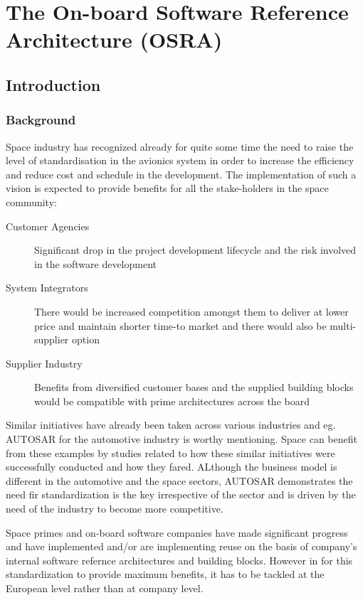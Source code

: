 
\chapter{The On-board Software Reference Architecture (OSRA)}
\label{chap:OSRA}
\section*{Introduction}
\subsection*{Background}
Space industry has recognized already for quite some time the need to raise the level of standardisation in the avionics system in order to increase the efficiency and reduce cost and schedule in the development.
The implementation of such a vision is expected to provide benefits for all the stake-holders in the space community:
\begin{description}
\item  [Customer Agencies] Significant drop in the project development lifecycle and the risk involved in the software development
\item [System Integrators] There would be increased competition amongst them to deliver at lower price and maintain shorter time-to market and there would also be multi-supplier option
\item [Supplier Industry] Benefits from diversified customer bases and the supplied building blocks would be compatible with prime architectures across the board
\end{description}

Similar initiatives have already been taken across various industries and eg. AUTOSAR for the automotive industry is worthy mentioning. Space can benefit from these examples by studies related to how these similar initiatives were successfully conducted and how they fared. ALthough the business model is different in the automotive and the space sectors, AUTOSAR demonstrates the need fir standardization is the key irrespective of the sector and is driven by the need of the industry to become more competitive.

Space primes and on-board software companies have made significant progress and have implemented and/or are implementing reuse on the basis of company's internal software refernce architectures and building blocks. However in for this standardization to provide maximum benefits, it has to be tackled at the European level rather than at company level.

